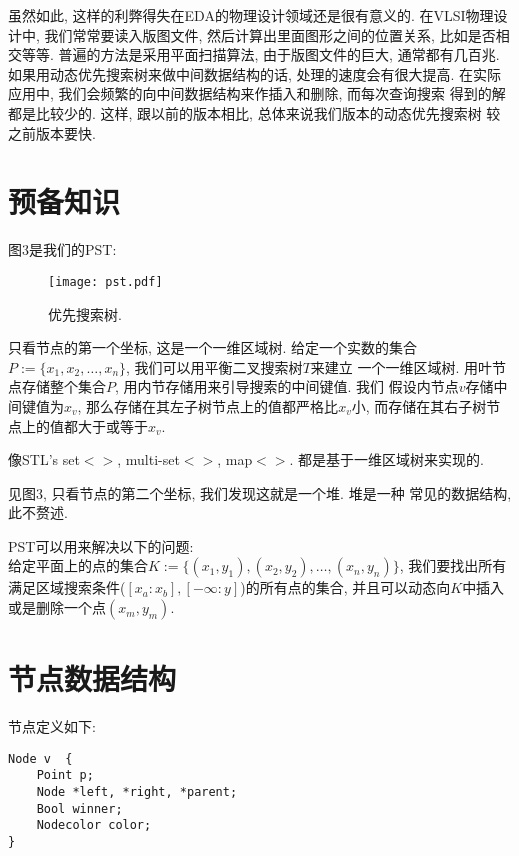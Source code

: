 \documentclass[a4paper]{article}
\begin{document}
虽然如此, 这样的利弊得失在EDA的物理设计领域还是很有意义的. 在VLSI物理设计中, 
我们常常要读入版图文件, 然后计算出里面图形之间的位置关系, 比如是否相交等等. 
普遍的方法是采用平面扫描算法, 由于版图文件的巨大, 通常都有几百兆. 
如果用动态优先搜索树来做中间数据结构的话, 处理的速度会有很大提高. 
在实际应用中, 我们会频繁的向中间数据结构来作插入和删除, 而每次查询搜索
得到的解都是比较少的. 这样, 跟以前的版本相比, 总体来说我们版本的动态优先搜索树
较之前版本要快. 

\section{预备知识}
图3是我们的PST:
\begin{figure*}[!h]
  \centering
  \texttt{[image: pst.pdf]}\\
  \caption{优先搜索树.}\label{fig:pst}
\end{figure*}

只看节点的第一个坐标, 这是一个一维区域树. 
给定一个实数的集合$P:=\{x_1,x_2,\ldots,x_n\}$, 我们可以用平衡二叉搜索树$T$来建立
一个一维区域树. 用叶节点存储整个集合$P$, 用内节存储用来引导搜索的中间键值. 我们
假设内节点$v$存储中间键值为$x_v$, 那么存储在其左子树节点上的值都严格比$x_v$小,
而存储在其右子树节点上的值都大于或等于$x_v$.

像STL's set$<>$, multi-set$<>$, map$<>$. 都是基于一维区域树来实现的. 


见图3, 只看节点的第二个坐标, 我们发现这就是一个堆. 堆是一种
常见的数据结构, 此不赘述. 


PST可以用来解决以下的问题:\\
给定平面上的点的集合$K:=\{(x_1,y_1),(x_2,y_2),\ldots,(x_n,y_n)\}$, 
我们要找出所有满足区域搜索条件($[x_a:x_b],[-\infty:y]$)的所有点的集合, 
并且可以动态向$K$中插入或是删除一个点$(x_m,y_m)$. 


\section{节点数据结构}

节点定义如下: 
\begin{verbatim}
Node v 	{
    Point p;
    Node *left, *right, *parent;
    Bool winner;
    Nodecolor color;
}
\end{verbatim}
\end{document}
